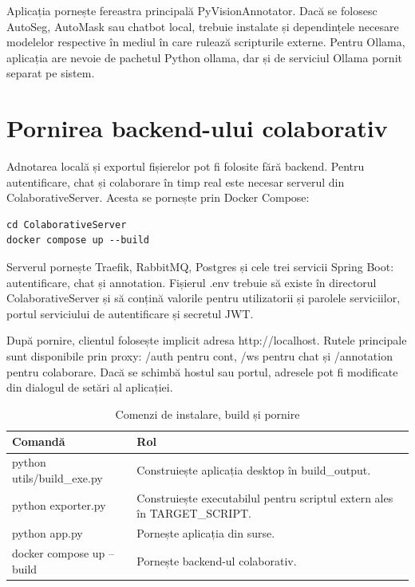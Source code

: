 Aplicația pornește fereastra principală PyVisionAnnotator. Dacă se folosesc AutoSeg, AutoMask sau chatbot local, trebuie instalate și dependințele necesare modelelor respective în mediul în care rulează scripturile externe. Pentru Ollama, aplicația are nevoie de pachetul Python ollama, dar și de serviciul Ollama pornit separat pe sistem.

\section{Pornirea backend-ului colaborativ}

Adnotarea locală și exportul fișierelor pot fi folosite fără backend. Pentru autentificare, chat și colaborare în timp real este necesar serverul din ColaborativeServer. Acesta se pornește prin Docker Compose:

\begin{verbatim}
cd ColaborativeServer
docker compose up --build
\end{verbatim}

Serverul pornește Traefik, RabbitMQ, Postgres și cele trei servicii Spring Boot: autentificare, chat și annotation. Fișierul .env trebuie să existe în directorul ColaborativeServer și să conțină valorile pentru utilizatorii și parolele serviciilor, portul serviciului de autentificare și secretul JWT.

După pornire, clientul folosește implicit adresa http://localhost. Rutele principale sunt disponibile prin proxy: /auth pentru cont, /ws pentru chat și /annotation pentru colaborare. Dacă se schimbă hostul sau portul, adresele pot fi modificate din dialogul de setări al aplicației.

\begin{table}[!htbp]
    \centering
    \small
    \begin{tabular}{p{} p{}}
        \hline
        Comandă & Rol \\
        \hline
        python utils/build\_exe.py & Construiește aplicația desktop în build\_output. \\
        python exporter.py & Construiește executabilul pentru scriptul extern ales în TARGET\_SCRIPT. \\
        python app.py & Pornește aplicația din surse. \\
        docker compose up --build & Pornește backend-ul colaborativ. \\
        \hline
    \end{tabular}
    \caption{Comenzi de instalare, build și pornire}
    \label{tab:comenzi-instalare}
\end{table}

